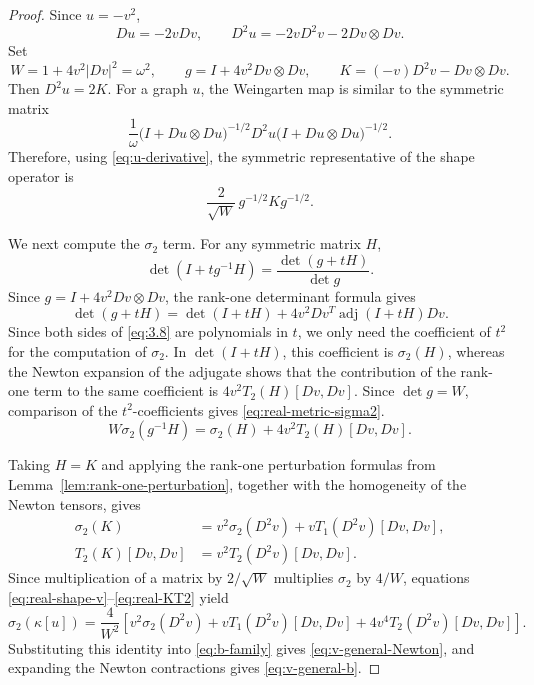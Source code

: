 \documentclass{article}
\numberwithin{equation}{section}
\begin{document}
\begin{proof}
Since $u=-v^2$,
\begin{equation}\label{eq:u-derivative}
Du=-2vDv,
\qquad
D^2u=-2vD^2v-2Dv\otimes Dv.
\end{equation}
Set
\begin{equation}
W=1+4v^2|Dv|^2=\omega^2,
\qquad
g=I+4v^2Dv\otimes Dv,
\qquad
K=(-v)D^2v-Dv\otimes Dv.
\end{equation}
Then $D^2u=2K$. For a graph $u$, the Weingarten map is similar to the
symmetric matrix
\begin{equation}
\frac{1}{\omega}
\bigl(I+Du\otimes Du\bigr)^{-1/2}
D^2u
\bigl(I+Du\otimes Du\bigr)^{-1/2}.
\end{equation}
Therefore, using \eqref{eq:u-derivative}, the symmetric representative
of the shape operator is
\begin{equation}\label{eq:real-shape-v}
\frac{2}{\sqrt{W}}\,g^{-1/2}Kg^{-1/2}.
\end{equation}

We next compute the $\sigma_2$ term. For any symmetric matrix $H$,
\begin{equation}\label{eq:3.8}
\det(I+t g^{-1}H)
=
\frac{\det(g+tH)}{\det g}.
\end{equation}
Since $g=I+4v^2Dv\otimes Dv$, the rank-one determinant formula gives
\begin{equation}
\det(g+tH)
=
\det(I+tH)
+
4v^2Dv^T\operatorname{adj}(I+tH)Dv.
\end{equation}
Since both sides of \eqref{eq:3.8} are polynomials in \(t\), we only need the
coefficient of $t^2$ for the computation of $\sigma_2$. In \(\det(I+tH)\), this coefficient is \(\sigma_2(H)\), whereas the Newton expansion of the adjugate shows that the contribution of the rank-one term to the same coefficient is \(4v^2T_2(H)[Dv,Dv]\). Since \(\det g=W\), comparison of the \(t^2\)-coefficients gives \eqref{eq:real-metric-sigma2}.
\begin{equation}\label{eq:real-metric-sigma2}
W\sigma_2(g^{-1}H)
=
\sigma_2(H)
+
4v^2T_2(H)[Dv,Dv].
\end{equation}

Taking $H=K$ and applying the rank-one perturbation formulas from
Lemma~\ref{lem:rank-one-perturbation}, together with the homogeneity of
the Newton tensors, gives
\begin{align}
\sigma_2(K)
&=
v^2\sigma_2(D^2v)
+
vT_1(D^2v)[Dv,Dv],
\label{eq:real-Ksigma2}\\
T_2(K)[Dv,Dv]
&=
v^2T_2(D^2v)[Dv,Dv].
\label{eq:real-KT2}
\end{align}
Since multiplication of a matrix by $2/\sqrt W$ multiplies
$\sigma_2$ by $4/W$, equations
\eqref{eq:real-shape-v}--\eqref{eq:real-KT2} yield
\begin{equation}\label{eq:real-sigma2-final}
\sigma_2(\kappa[u])
=
\frac{4}{W^2}
\left[
v^2\sigma_2(D^2v)
+
vT_1(D^2v)[Dv,Dv]
+
4v^4T_2(D^2v)[Dv,Dv]
\right].
\end{equation}
Substituting this identity into \eqref{eq:b-family} gives
\eqref{eq:v-general-Newton}, and expanding the Newton contractions gives
\eqref{eq:v-general-b}.
\end{proof}
\end{document}
